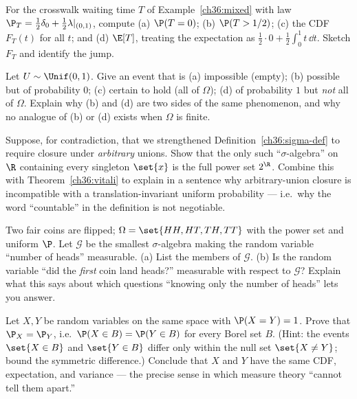 \begin{exercise}
\label{ch36:ex-mixed}
For the crosswalk waiting time $T$ of Example~\ref{ch36:mixed} with law
$\P_T = \tfrac12\delta_0 + \tfrac12\lambda|_{(0,1)}$, compute (a) $\P(T = 0)$;
(b) $\P(T > 1/2)$; (c) the CDF $F_T(t)$ for all $t$; and (d) $\E[T]$, treating the
expectation as $\tfrac12 \cdot 0 + \tfrac12 \int_0^1 t\,\dd t$. Sketch $F_T$ and
identify the jump.
\end{exercise}

\begin{exercise}
\label{ch36:ex-as}
Let $U \sim \Unif(0,1)$. Give an event that is (a) impossible (empty);
(b) possible but of probability $0$; (c) certain to hold (all of $\Omega$);
(d) of probability $1$ but \emph{not} all of $\Omega$. Explain why (b) and (d) are
two sides of the same phenomenon, and why no analogue of (b) or (d) exists when
$\Omega$ is finite.
\end{exercise}

\begin{exercise}
\label{ch36:ex-why-countable}
Suppose, for contradiction, that we strengthened
Definition~\ref{ch36:sigma-def} to require closure under \emph{arbitrary} unions.
Show that the only such ``$\sigma$-algebra'' on $\R$ containing every singleton
$\set{x}$ is the full power set $2^{\R}$. Combine this with
Theorem~\ref{ch36:vitali} to explain in a sentence why arbitrary-union closure is
incompatible with a translation-invariant uniform probability --- i.e.\ why the
word ``countable'' in the definition is not negotiable.
\end{exercise}

\begin{exercise}
\label{ch36:ex-info}
Two fair coins are flipped; $\Omega = \set{HH, HT, TH, TT}$ with the power set and
uniform $\P$. Let $\mathcal{G}$ be the smallest $\sigma$-algebra making the
random variable ``number of heads'' measurable. (a) List the members of
$\mathcal{G}$. (b) Is the random variable ``did the \emph{first} coin land heads?''
measurable with respect to $\mathcal{G}$? Explain what this says about which
questions ``knowing only the number of heads'' lets you answer.
\end{exercise}

\begin{exercise}
\label{ch36:ex-as-law}
Let $X, Y$ be random variables on the same space with $\P(X = Y) = 1$. Prove that
$\P_X = \P_Y$, i.e.\ $\P(X \in B) = \P(Y \in B)$ for every Borel set $B$. (Hint:
the events $\set{X \in B}$ and $\set{Y \in B}$ differ only within the null set
$\set{X \ne Y}$; bound the symmetric difference.) Conclude that $X$ and $Y$ have
the same CDF, expectation, and variance --- the precise sense in which measure
theory ``cannot tell them apart.''
\end{exercise}
